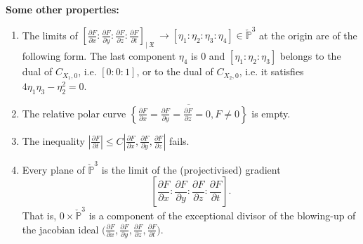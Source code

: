 \documentclass[12pt]{amsart}
\theoremstyle{definition}
\numberwithin{equation}{section}
\DeclareMathOperator{\frakX}{\mathfrak {X}}
\begin{document}
\noindent
{\bf Some other properties:}
\begin{enumerate}
\item
The limits of $\left [\frac{\partial F}{\partial x}:\frac{\partial F}{\partial y}:\frac{\partial F}{\partial z}:\frac{\partial F}{\partial t}\right]_{|\frakX} \to [\eta_1:\eta_2:\eta_3:\eta_4]\in \check {\mathbb P}^3$ at the origin are of the following form.  The last component $\eta_4$ is $0$ and $[\eta_1:\eta_2:\eta_3]$ belongs to the dual of $C_{X_1,0}$, i.e. $[0:0:1]$, or to the dual of $C_{X_2,0}$, i.e. it satisfies $4\eta_1\eta_3-\eta_2^2=0$. 
\item
The relative polar curve 
$ \overline{\left \{\frac {\partial F} {\partial x}=\frac {\partial F} {\partial y}=\frac {\partial F} {\partial z} =0, F\ne 0 \right\}}$ is empty.
\item
The inequality 
$|\frac {\partial F} {\partial t}| \leq C |\frac {\partial F} {\partial x} ,\frac {\partial F} {\partial y} ,\frac {\partial F} {\partial z} |$
fails.
\item 
Every plane of $\check{\mathbb P}^3$ is the limit of the (projectivised) gradient 
$$
 \left [\frac {\partial F} {\partial x} :  \frac {\partial F} {\partial y} :  \frac {\partial F} {\partial z} :  \frac {\partial F} {\partial t} \right ] .$$
That is, $0\times \check{\mathbb P}^3$ is a component of the exceptional divisor of the blowing-up of the jacobian ideal 
$\bigl ( \frac { \partial F} {\partial x} ,\frac {\partial F} {\partial y} , \frac {\partial F} {\partial z}, \frac {\partial F} {\partial t} \bigr )$. 
\end{enumerate} 
\end{document}
